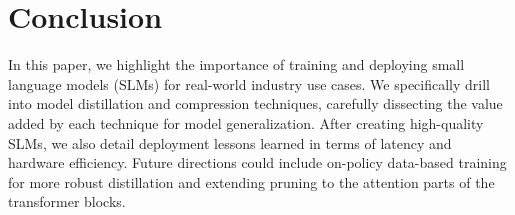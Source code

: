\section{Conclusion}

In this paper, we highlight the importance of training and deploying small language models (SLMs) for real-world industry use cases. We specifically drill into model distillation and compression techniques, carefully dissecting the value added by each technique for model generalization. After creating high-quality SLMs, we also detail deployment lessons learned in terms of latency and hardware efficiency. Future directions could include on-policy data-based training for more robust distillation and extending pruning to the attention parts of the transformer blocks.